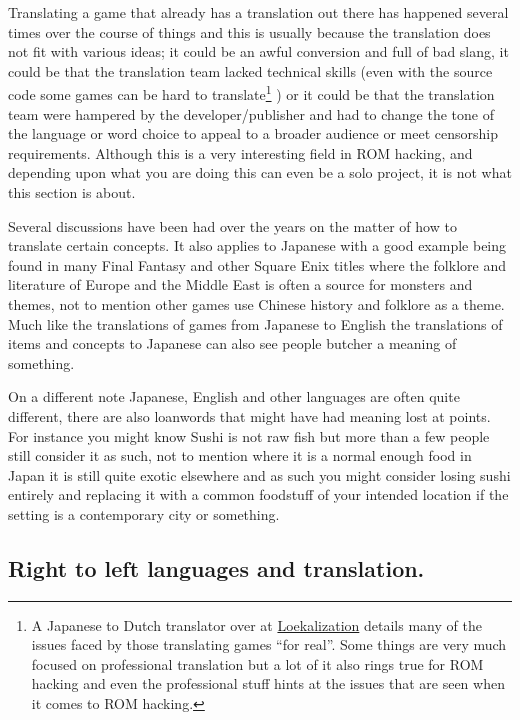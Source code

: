 \documentclass[
]{book}
\begin{document}
Translating a game that already has a translation out there has happened several times over the course of things and this is usually because the translation does not fit with various ideas; it could be an awful conversion and full of bad slang, it could be that the translation team lacked technical skills (even with the source code some games can be hard to translate\footnote{A Japanese to Dutch translator over at \href{http://www.loekalization.com/mistakes.html}{Loekalization} details many of the issues faced by those translating games ``for real''. Some things are very much focused on professional translation but a lot of it also rings true for ROM hacking and even the professional stuff hints at the issues that are seen when it comes to ROM hacking.} ) or it could be that the translation team were hampered by the developer/publisher and had to change the tone of the language or word choice to appeal to a broader audience or meet censorship requirements. Although this is a very interesting field in ROM hacking, and depending upon what you are doing this can even be a solo project, it is not what this section is about.

Several discussions have been had over the years on the matter of how to translate certain concepts. It also applies to Japanese with a good example being found in many Final Fantasy and other Square Enix titles where the folklore and literature of Europe and the Middle East is often a source for monsters and themes, not to mention other games use Chinese history and folklore as a theme. Much like the translations of games from Japanese to English the translations of items and concepts to Japanese can also see people butcher a meaning of something.

On a different note Japanese, English and other languages are often quite different, there are also loanwords that might have had meaning lost at points. For instance you might know Sushi is not raw fish but more than a few people still consider it as such, not to mention where it is a normal enough food in Japan it is still quite exotic elsewhere and as such you might consider losing sushi entirely and replacing it with a common foodstuff of your intended location if the setting is a contemporary city or something.

\hypertarget{right-to-left-languages-and-translation.}{%
\subsection{Right to left languages and translation.}\label{right-to-left-languages-and-translation.}}
\end{document}
